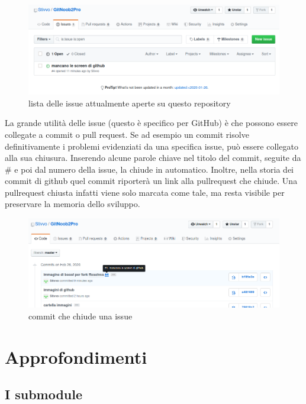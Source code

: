 \documentclass{article}
\begin{document}
\begin{figure}
\includegraphics[width=6in]{img/issue.png}
\centering
\caption{lista delle issue attualmente aperte su questo repository }
\end{figure}

La grande utilità delle issue (questo è specifico per GitHub) è che possono
essere collegate a commit o pull request. Se ad esempio un commit risolve
definitivamente i problemi evidenziati da una specifica issue, può essere
collegato alla sua chiusura.
Inserendo alcune 
{parole chiave}
nel titolo del commit, seguite da \# e poi dal numero della issue, la chiude in
automatico. Inoltre, nella storia dei commit di github quel commit riporterà un
link alla pullrequest che chiude. Una pullrequest chiusta infatti viene solo
marcata come tale, ma resta visibile per preservare la memoria dello sviluppo.

\begin{figure}
\includegraphics[width=6in]{img/commitCloseIssue.png}
\centering
\caption{commit che chiude una issue }
\end{figure}

\section{Approfondimenti}

\subsection{I submodule}
\end{document}
